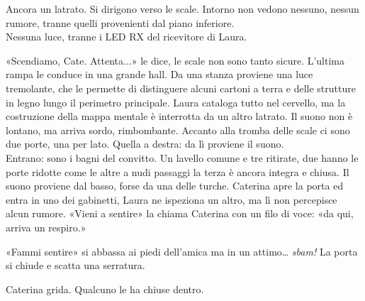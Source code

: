 \par\medskip
Ancora un latrato. Si dirigono verso le scale. Intorno non vedono nessuno, nessun rumore, tranne quelli provenienti dal piano inferiore.\\
Nessuna luce, tranne i LED RX del ricevitore di Laura.

\par\medskip
«Scendiamo, Cate. Attenta...» le dice, le scale non sono tanto sicure. L'ultima rampa le conduce in una grande hall. Da una stanza proviene una luce tremolante, che le permette di distinguere alcuni cartoni a terra e delle strutture in legno lungo il perimetro principale. Laura cataloga tutto nel cervello, ma la costruzione della mappa mentale \`e interrotta da un altro latrato. Il suono non \`e lontano, ma arriva sordo, rimbombante. Accanto alla tromba delle scale ci sono due porte, una per lato. Quella a destra: da lì proviene il suono.\\
Entrano: sono i bagni del convitto. Un lavello comune e tre ritirate, due hanno le porte ridotte come le altre a nudi passaggi la terza \`e ancora integra e chiusa. Il suono proviene dal basso, forse da una delle turche. Caterina apre la porta ed entra in uno dei gabinetti, Laura ne ispeziona un altro, ma l\`i non percepisce alcun rumore.
«Vieni a sentire» la chiama Caterina con un filo di voce: «da qui, arriva un respiro.»

\par\medskip
«Fammi sentire» si abbassa ai piedi dell'amica ma in un attimo… \emph{sbam!}
La porta si chiude e scatta una serratura.

\par\medskip
Caterina grida. Qualcuno le ha chiuse dentro.
